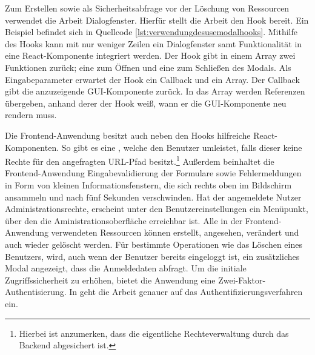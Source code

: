 Zum Erstellen sowie als Sicherheitsabfrage vor der Löschung von Ressourcen verwendet die Arbeit Dialogfenster.
Hierfür stellt die Arbeit den  Hook bereit. Ein Beispiel befindet sich in
Quellcode \ref{lst:verwendungdesusemodalhooks}. Mithilfe des Hooks
kann mit nur weniger Zeilen ein Dialogfenster samt Funktionalität in eine React-Komponente integriert werden.
Der  Hook gibt in einem Array zwei Funktionen zurück; eine zum Öffnen und eine zum
Schließen des Modals. Als Eingabeparameter erwartet der Hook ein Callback und ein Array. Der Callback
gibt die anzuzeigende GUI-Komponente zurück. In das Array werden Referenzen übergeben, anhand derer
der Hook weiß, wann er die GUI-Komponente neu rendern muss.

Die Frontend\hyp{}Anwendung besitzt auch neben
den Hooks hilfreiche React\hyp{}Komponenten. So gibt es
eine , welche den Benutzer umleistet, falls dieser keine Rechte für den
angefragten URL-Pfad besitzt.\footnote{Hierbei ist anzumerken, dass die eigentliche Rechteverwaltung durch
das Backend abgesichert ist.} Außerdem beinhaltet die Frontend-Anwendung Eingabevalidierung der Formulare
sowie Fehlermeldungen in Form von kleinen Informationsfenstern, die sich rechts oben im Bildschirm ansammeln
und nach fünf Sekunden verschwinden. Hat der angemeldete Nutzer Administrationsrechte, erscheint unter den
Benutzereinstellungen ein Menüpunkt, über den die Aministrationsoberfläche erreichbar ist. Alle in der
Frontend-Anwendung verwendeten Ressourcen können erstellt, angesehen, verändert und auch wieder gelöscht werden.
Für bestimmte Operationen wie das Löschen eines Benutzers, wird, auch wenn der Benutzer bereits eingeloggt ist,
ein zusätzliches Modal angezeigt, dass die Anmeldedaten abfragt. Um die initiale Zugriffssicherheit zu erhöhen,
bietet die Anwendung eine Zwei-Faktor-Authentisierung. In  geht die
Arbeit genauer auf das Authentifizierungsverfahren ein.


